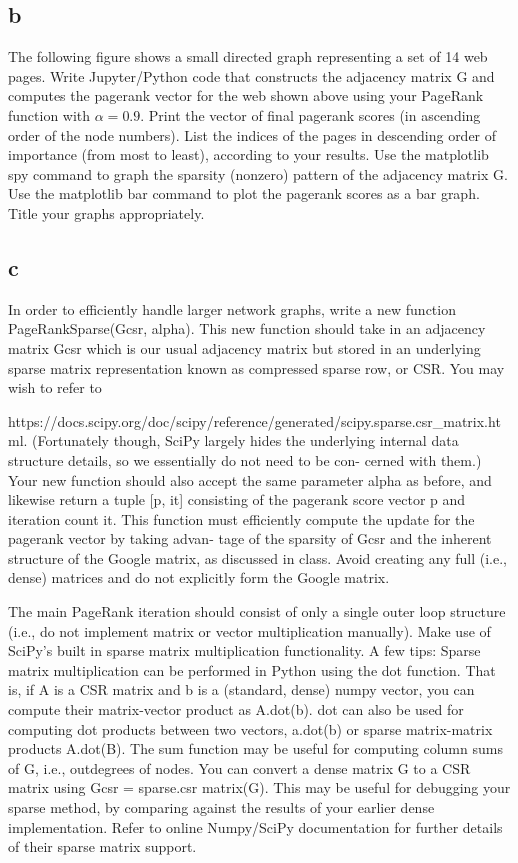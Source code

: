 \documentclass[11pt]{article}
\begin{document}
\subsection{b}

The following figure shows a small directed graph representing a set of 14 web pages. Write Jupyter/Python code that constructs the adjacency matrix G and computes the pagerank vector for the web shown above using your PageRank function with $\alpha = 0.9$. Print the vector of final pagerank scores (in ascending order of the node numbers). List the indices of the pages in descending order of importance (from most to least), according to your results. Use the matplotlib spy command to graph the sparsity (nonzero) pattern of the adjacency matrix G. Use the matplotlib bar command to plot the pagerank scores as a bar graph. Title your graphs appropriately.

\subsection{c}

In order to efficiently handle larger network graphs, write a new function PageRankSparse(Gcsr, alpha). This new function should take in an adjacency matrix Gcsr which is our usual adjacency matrix but stored in an underlying sparse matrix representation known as compressed sparse row, or CSR. You may wish to refer to 

https://docs.scipy.org/doc/scipy/reference/generated/scipy.sparse.csr\_matrix.html. (Fortunately though, SciPy largely hides the underlying internal data structure details, so we essentially do not need to be con- cerned with them.) Your new function should also accept the same parameter alpha as before, and likewise return a tuple [p, it] consisting of the pagerank score vector p and iteration count it. This function must efficiently compute the update for the pagerank vector by taking advan- tage of the sparsity of Gcsr and the inherent structure of the Google matrix, as discussed in class. Avoid creating any full (i.e., dense) matrices and do not explicitly form the Google matrix.

The main PageRank iteration should consist of only a single outer loop structure (i.e., do not implement matrix or vector multiplication manually). Make use of SciPy's built in sparse matrix multiplication functionality. A few tips: Sparse matrix multiplication can be performed in Python using the dot function. That is, if A is a CSR matrix and b is a (standard, dense) numpy vector, you can compute their matrix-vector product as A.dot(b). dot can also be used for computing dot products between two vectors, a.dot(b) or sparse matrix-matrix products A.dot(B). The sum function may be useful for computing column sums of G, i.e., outdegrees of nodes. You can convert a dense matrix G to a CSR matrix using Gcsr = sparse.csr matrix(G). This may be useful for debugging your sparse method, by comparing against the results of your earlier dense implementation. Refer to online Numpy/SciPy documentation for further details of their sparse matrix support.
\end{document}
